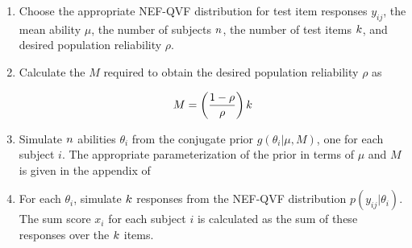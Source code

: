 \documentclass[12pt,epsfig]{article}
\newcommand{\changed}[1]{\textcolor{black}{#1}}
\newcommand{\numsubjects}{\changed{n}}%
\newcommand{\testlength}{\changed{k}}%
\begin{document}
\begin{enumerate}
\item Choose the appropriate NEF-QVF distribution for test item responses $y_{ij}$, the mean ability $\mu$, the number of subjects $\numsubjects$, the number of test items $\testlength$, and desired population reliability $\rho$.
\item Calculate the $M$ required to obtain the desired population reliability $\rho$ as 

\begin{equation*}
M = \left(\dfrac{1 - \rho}{\rho} \right) \testlength
\end{equation*} 

\item Simulate $\numsubjects$ abilities $\theta_i$ from the conjugate prior $g(\theta_i | \mu, M)$, one for each subject $i$. The appropriate parameterization of the prior in terms of $\mu$ and $M$ is given in the appendix of \cite{Foster2020}
\item For each $\theta_i$, simulate $\testlength$ responses from the NEF-QVF distribution $p(y_{ij} | \theta_i)$. The sum score $x_i$ for each subject $i$ is calculated as the sum of these responses over the $\testlength$ items.
\end{enumerate}

\end{document}
